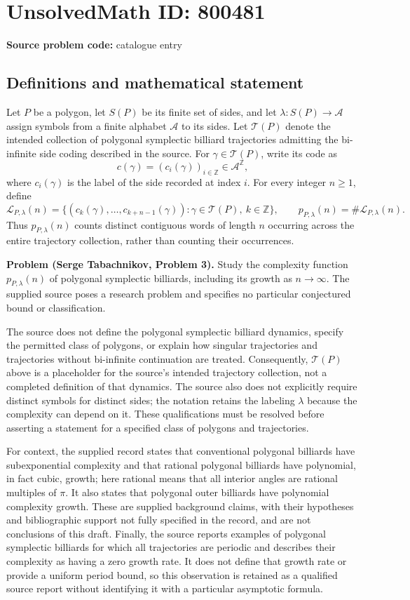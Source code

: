 \documentclass[11pt]{article}
\newcommand{\Z}{\mathbb{Z}}
\begin{document}
\section*{UnsolvedMath ID: 800481}
\textbf{Source problem code:} catalogue entry
\subsection{Definitions and mathematical statement}
Let \(P\) be a polygon, let \(S(P)\) be its finite set of sides, and let \(\lambda:S(P)\to\mathcal A\) assign symbols from a finite alphabet \(\mathcal A\) to its sides. Let \(\mathcal T(P)\) denote the intended collection of polygonal symplectic billiard trajectories admitting the bi-infinite side coding described in the source. For \(\gamma\in\mathcal T(P)\), write its code as
\[
 c(\gamma)=(c_i(\gamma))_{i\in\Z}\in\mathcal A^{\Z},
\]
where \(c_i(\gamma)\) is the label of the side recorded at index \(i\). For every integer \(n\geq1\), define
\[
 \mathcal L_{P,\lambda}(n)
 =\bigl\{(c_k(\gamma),\ldots,c_{k+n-1}(\gamma)):
       \gamma\in\mathcal T(P),\ k\in\Z\bigr\},
 \qquad
 p_{P,\lambda}(n)=\#\mathcal L_{P,\lambda}(n).
\]
Thus \(p_{P,\lambda}(n)\) counts distinct contiguous words of length \(n\) occurring across the entire trajectory collection, rather than counting their occurrences.

\textbf{Problem (Serge Tabachnikov, Problem 3).} Study the complexity function \(p_{P,\lambda}(n)\) of polygonal symplectic billiards, including its growth as \(n\to\infty\). The supplied source poses a research problem and specifies no particular conjectured bound or classification.

The source does not define the polygonal symplectic billiard dynamics, specify the permitted class of polygons, or explain how singular trajectories and trajectories without bi-infinite continuation are treated. Consequently, \(\mathcal T(P)\) above is a placeholder for the source's intended trajectory collection, not a completed definition of that dynamics. The source also does not explicitly require distinct symbols for distinct sides; the notation retains the labeling \(\lambda\) because the complexity can depend on it. These qualifications must be resolved before asserting a statement for a specified class of polygons and trajectories.

For context, the supplied record states that conventional polygonal billiards have subexponential complexity and that rational polygonal billiards have polynomial, in fact cubic, growth; here rational means that all interior angles are rational multiples of \(\pi\). It also states that polygonal outer billiards have polynomial complexity growth. These are supplied background claims, with their hypotheses and bibliographic support not fully specified in the record, and are not conclusions of this draft. Finally, the source reports examples of polygonal symplectic billiards for which all trajectories are periodic and describes their complexity as having a zero growth rate. It does not define that growth rate or provide a uniform period bound, so this observation is retained as a qualified source report without identifying it with a particular asymptotic formula.
\end{document}
